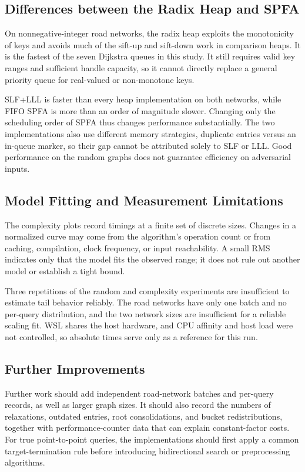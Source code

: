 \subsection{Differences between the Radix Heap and SPFA}
On nonnegative-integer road networks, the radix heap exploits the monotonicity of
keys and avoids much of the sift-up and sift-down work in comparison heaps. It is the
fastest of the seven Dijkstra queues in this study. It still requires valid key
ranges and sufficient handle capacity, so it cannot directly replace a general
priority queue for real-valued or non-monotone keys.

SLF+LLL is faster than every heap implementation on both networks, while FIFO SPFA is
more than an order of magnitude slower. Changing only the scheduling order of SPFA
thus changes performance substantially. The two implementations also use different
memory strategies, duplicate entries versus an in-queue marker, so their gap cannot
be attributed solely to SLF or LLL. Good performance on the random graphs does not
guarantee efficiency on adversarial inputs.

\subsection{Model Fitting and Measurement Limitations}
The complexity plots record timings at a finite set of discrete sizes. Changes in a
normalized curve may come from the algorithm's operation count or from caching,
compilation, clock frequency, or input reachability. A small RMS indicates only that
the model fits the observed range; it does not rule out another model or establish a
tight bound.

Three repetitions of the random and complexity experiments are insufficient to
estimate tail behavior reliably. The road networks have only one batch and no
per-query distribution, and the two network sizes are insufficient for a reliable
scaling fit. WSL shares the host hardware, and CPU affinity and host load were not
controlled, so absolute times serve only as a reference for this run.

\subsection{Further Improvements}
Further work should add independent road-network batches and per-query records, as
well as larger graph sizes. It should also record the numbers of relaxations,
outdated entries, root consolidations, and bucket redistributions, together with
performance-counter data that can explain constant-factor costs. For true
point-to-point queries, the implementations should first apply a common
target-termination rule before introducing bidirectional search or preprocessing
algorithms.

